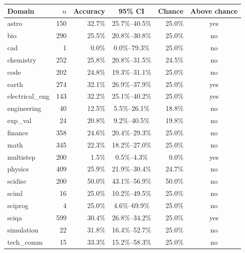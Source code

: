 \begin{tabular}{lrrcrc}
\toprule
Domain & $n$ & Accuracy & 95\% CI & Chance & Above chance \\
\midrule
astro & 150 & 32.7\% & 25.7\%--40.5\% & 25.0\% & yes \\
bio & 290 & 25.5\% & 20.8\%--30.8\% & 25.0\% & no \\
cad & 1 & 0.0\% & 0.0\%--79.3\% & 25.0\% & no \\
chemistry & 252 & 25.8\% & 20.8\%--31.5\% & 24.5\% & no \\
code & 202 & 24.8\% & 19.3\%--31.1\% & 25.0\% & no \\
earth & 274 & 32.1\% & 26.9\%--37.9\% & 25.0\% & yes \\
electrical\_eng & 143 & 32.2\% & 25.1\%--40.2\% & 25.0\% & yes \\
engineering & 40 & 12.5\% & 5.5\%--26.1\% & 18.8\% & no \\
exp\_val & 24 & 20.8\% & 9.2\%--40.5\% & 19.8\% & no \\
finance & 358 & 24.6\% & 20.4\%--29.3\% & 25.0\% & no \\
math & 345 & 22.3\% & 18.2\%--27.0\% & 25.0\% & no \\
multistep & 200 & 1.5\% & 0.5\%--4.3\% & 0.0\% & yes \\
physics & 409 & 25.9\% & 21.9\%--30.4\% & 24.7\% & no \\
scidisc & 200 & 50.0\% & 43.1\%--56.9\% & 50.0\% & no \\
sciml & 16 & 25.0\% & 10.2\%--49.5\% & 25.0\% & no \\
sciprog & 4 & 25.0\% & 4.6\%--69.9\% & 25.0\% & no \\
sciqa & 599 & 30.4\% & 26.8\%--34.2\% & 25.0\% & yes \\
simulation & 22 & 31.8\% & 16.4\%--52.7\% & 25.0\% & no \\
tech\_comm & 15 & 33.3\% & 15.2\%--58.3\% & 25.0\% & no \\
\bottomrule
\end{tabular}
